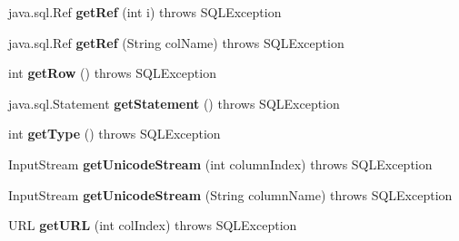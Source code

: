 \begin{DoxyCompactItemize}
java.\+sql.\+Ref {\bfseries get\+Ref} (int i)  throws S\+Q\+L\+Exception 
\item 
\mbox{\label{classcom_1_1mysql_1_1cj_1_1jdbc_1_1result_1_1_result_set_impl_a4311c8f11b6fdf58d57ff04a75955643}} 
java.\+sql.\+Ref {\bfseries get\+Ref} (String col\+Name)  throws S\+Q\+L\+Exception 
\item 
\mbox{\label{classcom_1_1mysql_1_1cj_1_1jdbc_1_1result_1_1_result_set_impl_a8615a7c1bc1a80dc5aa47b0990fa07e2}} 
int {\bfseries get\+Row} ()  throws S\+Q\+L\+Exception 
\item 
\mbox{\label{classcom_1_1mysql_1_1cj_1_1jdbc_1_1result_1_1_result_set_impl_aa93b35c26ae9e8707ad703e40d5c2bff}} 
java.\+sql.\+Statement {\bfseries get\+Statement} ()  throws S\+Q\+L\+Exception 
\item 
\mbox{\label{classcom_1_1mysql_1_1cj_1_1jdbc_1_1result_1_1_result_set_impl_abde00cbe923772688815f6adc617ac9d}} 
int {\bfseries get\+Type} ()  throws S\+Q\+L\+Exception 
\item 
\mbox{\label{classcom_1_1mysql_1_1cj_1_1jdbc_1_1result_1_1_result_set_impl_a784e00f0c74e5e75fca985a0a9ff028d}} 
Input\+Stream {\bfseries get\+Unicode\+Stream} (int column\+Index)  throws S\+Q\+L\+Exception 
\item 
\mbox{\label{classcom_1_1mysql_1_1cj_1_1jdbc_1_1result_1_1_result_set_impl_a7909bbbb222c3e827d751336e88d0064}} 
Input\+Stream {\bfseries get\+Unicode\+Stream} (String column\+Name)  throws S\+Q\+L\+Exception 
\item 
\mbox{\label{classcom_1_1mysql_1_1cj_1_1jdbc_1_1result_1_1_result_set_impl_a01de8a4128adfa8730b376e1d15f4ad4}} 
U\+RL {\bfseries get\+U\+RL} (int col\+Index)  throws S\+Q\+L\+Exception 
\item 
\mbox{\label{classcom_1_1mysql_1_1cj_1_1jdbc_1_1result_1_1_result_set_impl_a5a86582669418bcc8050d97acf095740}} 

\end{DoxyCompactItemize}
